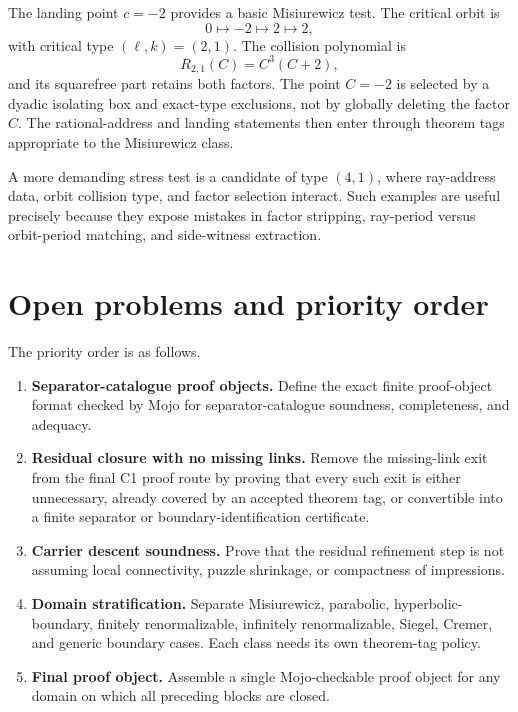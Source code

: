 \documentclass[11pt]{amsart}
\begin{document}
The landing point \(c=-2\) provides a basic Misiurewicz test.  The critical orbit is
\[
        0\mapsto -2\mapsto 2\mapsto 2,
\]
with critical type \((\ell,k)=(2,1)\).  The collision polynomial is
\[
        R_{2,1}(C)=C^3(C+2),
\]
and its squarefree part retains both factors.  The point \(C=-2\) is selected by a dyadic isolating box and exact-type exclusions, not by globally deleting the factor \(C\).  The rational-address and landing statements then enter through theorem tags appropriate to the Misiurewicz class.

A more demanding stress test is a candidate of type \((4,1)\), where ray-address data, orbit collision type, and factor selection interact.  Such examples are useful precisely because they expose mistakes in factor stripping, ray-period versus orbit-period matching, and side-witness extraction.

\section{Open problems and priority order}

The priority order is as follows.

\begin{enumerate}[label=\textbf{P\arabic*.}]
\item \textbf{Separator-catalogue proof objects.}  Define the exact finite proof-object format checked by Mojo for separator-catalogue soundness, completeness, and adequacy.
\item \textbf{Residual closure with no missing links.}  Remove the missing-link exit from the final C1 proof route by proving that every such exit is either unnecessary, already covered by an accepted theorem tag, or convertible into a finite separator or boundary-identification certificate.
\item \textbf{Carrier descent soundness.}  Prove that the residual refinement step is not assuming local connectivity, puzzle shrinkage, or compactness of impressions.
\item \textbf{Domain stratification.}  Separate Misiurewicz, parabolic, hyperbolic-boundary, finitely renormalizable, infinitely renormalizable, Siegel, Cremer, and generic boundary cases.  Each class needs its own theorem-tag policy.
\item \textbf{Final proof object.}  Assemble a single Mojo-checkable proof object for any domain on which all preceding blocks are closed.
\end{enumerate}
\end{document}
